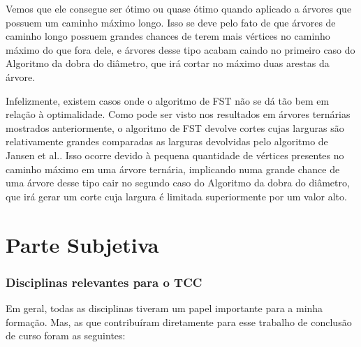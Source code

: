 \documentclass[a4paper,12pt]{article}
\begin{document}
Vemos que ele consegue ser ótimo ou quase ótimo quando aplicado
a árvores que possuem um caminho máximo longo. 
Isso se deve pelo
fato de que árvores de caminho longo possuem grandes chances
de terem mais vértices no caminho máximo do que fora dele, e
árvores desse tipo acabam caindo no primeiro caso do Algoritmo da 
dobra do diâmetro, que irá cortar no máximo duas arestas da árvore.

Infelizmente, existem casos onde o algoritmo de FST não se dá
tão bem em relação à optimalidade.
Como pode ser visto nos resultados em árvores ternárias mostrados 
anteriormente,
o algoritmo de FST devolve cortes cujas larguras são relativamente
grandes comparadas as larguras devolvidas pelo algoritmo de Jansen
et al.. 
Isso ocorre devido à pequena quantidade de vértices presentes 
no caminho máximo em uma árvore ternária, 
implicando numa grande chance de uma árvore desse tipo cair 
no segundo caso
do Algoritmo da dobra do diâmetro, que irá gerar um corte
cuja largura é
limitada superiormente por um valor alto.

\newpage



\newpage

\part{Parte Subjetiva}
\newpage


\section{Disciplinas relevantes para o TCC}
Em geral, todas as disciplinas tiveram um papel importante
para a minha formação. Mas, as que contribuíram
diretamente para esse trabalho de conclusão de curso
 foram as seguintes:
\end{document}
